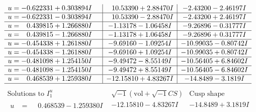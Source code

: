 \documentclass[1p]{elsarticle_modified}
\theoremstyle{definition}
\newcommand{\I}{\sqrt{-1}}
\begin{document}
$$\begin{array}{c|c|c}
\begin{aligned}
u &= -0.622331 + 0.303894 I\end{aligned}
 & \phantom{-}10.53390 + 2.88470 I & -2.43200 - 2.46197 I \\ \hline\begin{aligned}
u &= -0.622331 - 0.303894 I\end{aligned}
 & \phantom{-}10.53390 - 2.88470 I & -2.43200 + 2.46197 I \\ \hline\begin{aligned}
u &= \phantom{-}0.439815 + 1.266880 I\end{aligned}
 & -1.13178 - 1.06458 I & -9.26896 - 0.31777 I \\ \hline\begin{aligned}
u &= \phantom{-}0.439815 - 1.266880 I\end{aligned}
 & -1.13178 + 1.06458 I & -9.26896 + 0.31777 I \\ \hline\begin{aligned}
u &= -0.454338 + 1.261880 I\end{aligned}
 & -9.69160 - 1.09254 I & -10.99035 - 0.80742 I \\ \hline\begin{aligned}
u &= -0.454338 - 1.261880 I\end{aligned}
 & -9.69160 + 1.09254 I & -10.99035 + 0.80742 I \\ \hline\begin{aligned}
u &= -0.481098 + 1.254150 I\end{aligned}
 & -9.49472 - 8.55149 I & -10.56405 + 6.84602 I \\ \hline\begin{aligned}
u &= -0.481098 - 1.254150 I\end{aligned}
 & -9.49472 + 8.55149 I & -10.56405 - 6.84602 I \\ \hline\begin{aligned}
u &= \phantom{-}0.468539 + 1.259380 I\end{aligned}
 & -12.15810 + 4.83267 I & -14.8489 - 3.1819 I\\
 \hline 
 \end{array}$$\newpage$$\begin{array}{c|c|c}  
\text{Solutions to }I^u_{1}& \I (\text{vol} + \sqrt{-1}CS) & \text{Cusp shape}\\
 \hline 
\begin{aligned}
u &= \phantom{-}0.468539 - 1.259380 I\end{aligned}
 & -12.15810 - 4.83267 I & -14.8489 + 3.1819 I \\ \hline\begin{aligned}

\end{aligned}
\end{array}$$
\end{document}
